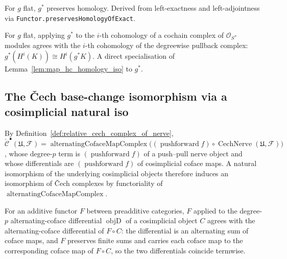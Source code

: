 \begin{lemma}
  \label{lem:pullback_preserves_homology}
  For \(g\) flat, \(g^*\) preserves homology. Derived from left-exactness and
  left-adjointness via \texttt{Functor.preservesHomologyOfExact}.
\end{lemma}

\begin{lemma}\leanok
  \label{lem:pullback_mapHC_homologyIso}
  For \(g\) flat, applying \(g^*\) to the \(i\)-th cohomology of a cochain complex of
  \(\mathcal{O}_S\)-modules agrees with the \(i\)-th cohomology of the degreewise
  pullback complex: \(g^*(H^i(K)) \cong H^i(g^* K)\). A direct specialisation of
  Lemma~\ref{lem:map_hc_homology_iso} to \(g^*\).
\end{lemma}

\subsection{The {\v C}ech base-change isomorphism via a cosimplicial natural iso}
\label{sec:cech_base_change_construction}

By Definition~\ref{def:relative_cech_complex_of_nerve},
\(\check{\mathcal{C}}^\bullet(\mathfrak{U}, \mathcal{F}) =
\operatorname{alternatingCofaceMapComplex}\bigl((\operatorname{pushforward} f) \circ
\operatorname{CechNerve}(\mathfrak{U}, \mathcal{F})\bigr)\), whose degree-\(p\) term is
\((\operatorname{pushforward} f)\) of a push--pull nerve object and whose differentials
are \((\operatorname{pushforward} f)\) of cosimplicial coface maps. A natural
isomorphism of the underlying cosimplicial objects therefore induces an isomorphism
of {\v C}ech complexes by functoriality of
\(\operatorname{alternatingCofaceMapComplex}\).

\begin{lemma}\leanok
  \label{lem:map_alternatingCofaceMapComplex_objD}
  For an additive functor \(F\) between preadditive categories, \(F\) applied to the
  degree-\(p\) alternating-coface differential \(\operatorname{objD}\) of a cosimplicial
  object \(C\) agrees with the alternating-coface differential of \(F \circ C\): the
  differential is an alternating sum of coface maps, and \(F\) preserves finite sums and
  carries each coface map to the corresponding coface map of \(F \circ C\), so the two
  differentials coincide termwise.
\end{lemma}

